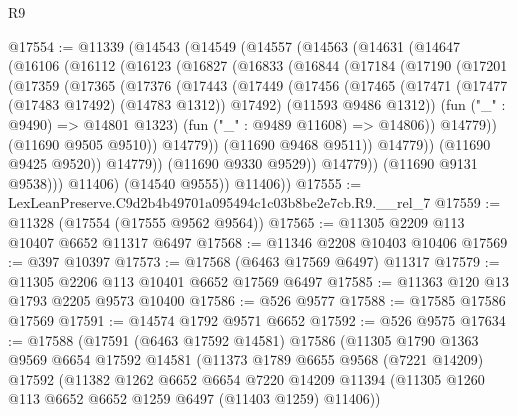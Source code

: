 \begin{lexlean}{R9}
\begin{coremodule}
@17554 := @11339
    (@14543
      (@14549
        (@14557
          (@14563
            (@14631
              (@14647
                (@16106
                  (@16112
                    (@16123
                      (@16827
                        (@16833
                          (@16844
                            (@17184
                              (@17190
                                (@17201
                                  (@17359
                                    (@17365
                                      (@17376
                                        (@17443
                                          (@17449
                                            (@17456
                                              (@17465
                                                (@17471
                                                  (@17477 (@17483 @17492) (@14783 @1312))
                                                  @17492)
                                                (@11593 @9486 @1312))
                                              (fun ("_" : @9490) => @14801 @1323)
                                              (fun ("_" : @9489 @11608) => @14806))
                                            @14779))
                                        (@11690 @9505 @9510))
                                      @14779))
                                  (@11690 @9468 @9511))
                                @14779))
                            (@11690 @9425 @9520))
                          @14779))
                      (@11690 @9330 @9529))
                    @14779))
                (@11690 @9131 @9538)))
            @11406)
          (@14540 @9555))
        @11406))
@17555 := LexLeanPreserve.C9d2b4b49701a095494c1c03b8be2e7cb.R9.__rel_7
@17559 := @11328 (@17554 (@17555 @9562 @9564))
@17565 := @11305 @2209 @113 @10407 @6652 @11317 @6497
@17568 := @11346 @2208 @10403 @10406
@17569 := @397 @10397
@17573 := @17568 (@6463 @17569 @6497) @11317
@17579 := @11305 @2206 @113 @10401 @6652 @17569 @6497
@17585 := @11363 @120 @13 @1793 @2205 @9573 @10400
@17586 := @526 @9577
@17588 := @17585 @17586 @17569
@17591 := @14574 @1792 @9571 @6652
@17592 := @526 @9575
@17634 := @17588
    (@17591
      (@6463 @17592 @14581)
      @17586
      (@11305
        @1790
        @1363
        @9569
        @6654
        @17592
        @14581
        (@11373
          @1789
          @6655
          @9568
          (@7221 @14209)
          @17592
          (@11382
            @1262
            @6652
            @6654
            @7220
            @14209
            @11394
            (@11305 @1260 @113 @6652 @6652 @1259 @6497 (@11403 @1259) @11406))

\end{coremodule}
\end{lexlean}
